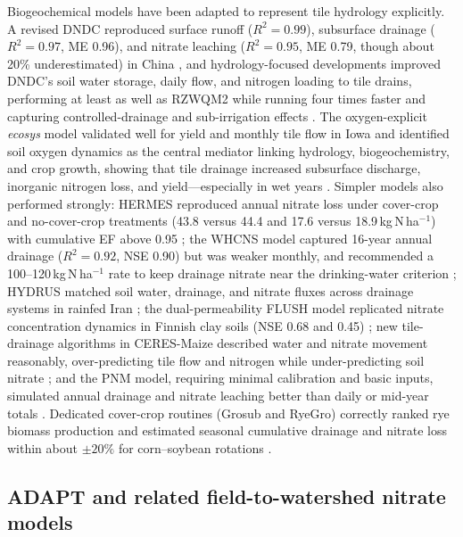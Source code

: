 \documentclass[11pt]{article}
\begin{document}
Biogeochemical models have been adapted to represent tile hydrology explicitly. A revised DNDC reproduced surface runoff ($R^2 = 0.99$), subsurface drainage ($R^2 = 0.97$, ME 0.96), and nitrate leaching ($R^2 = 0.95$, ME 0.79, though about 20\% underestimated) in China \parencite{Deng2011}, and hydrology-focused developments improved DNDC's soil water storage, daily flow, and nitrogen loading to tile drains, performing at least as well as RZWQM2 while running four times faster and capturing controlled-drainage and sub-irrigation effects \parencite{Smith2020}. The oxygen-explicit \textit{ecosys} model validated well for yield and monthly tile flow in Iowa and identified soil oxygen dynamics as the central mediator linking hydrology, biogeochemistry, and crop growth, showing that tile drainage increased subsurface discharge, inorganic nitrogen loss, and yield---especially in wet years \parencite{Ma2025}. Simpler models also performed strongly: HERMES reproduced annual nitrate loss under cover-crop and no-cover-crop treatments (43.8 versus 44.4 and 17.6 versus 18.9\,kg\,N\,ha$^{-1}$) with cumulative EF above 0.95 \parencite{Malone2017}; the WHCNS model captured 16-year annual drainage ($R^2 = 0.92$, NSE 0.90) but was weaker monthly, and recommended a 100--120\,kg\,N\,ha$^{-1}$ rate to keep drainage nitrate near the drinking-water criterion \parencite{Liang2018}; HYDRUS matched soil water, drainage, and nitrate fluxes across drainage systems in rainfed Iran \parencite{Haghnazari2020}; the dual-permeability FLUSH model replicated nitrate concentration dynamics in Finnish clay soils (NSE 0.68 and 0.45) \parencite{Salo2015}; new tile-drainage algorithms in CERES-Maize described water and nitrate movement reasonably, over-predicting tile flow and nitrogen while under-predicting soil nitrate \parencite{Garrison1999}; and the PNM model, requiring minimal calibration and basic inputs, simulated annual drainage and nitrate leaching better than daily or mid-year totals \parencite{Marjerison2016}. Dedicated cover-crop routines (Grosub and RyeGro) correctly ranked rye biomass production and estimated seasonal cumulative drainage and nitrate loss within about $\pm20\%$ for corn--soybean rotations \parencite{Feyereisen2006,Feyereisen2007}.

\subsection{ADAPT and related field-to-watershed nitrate models}
\end{document}
